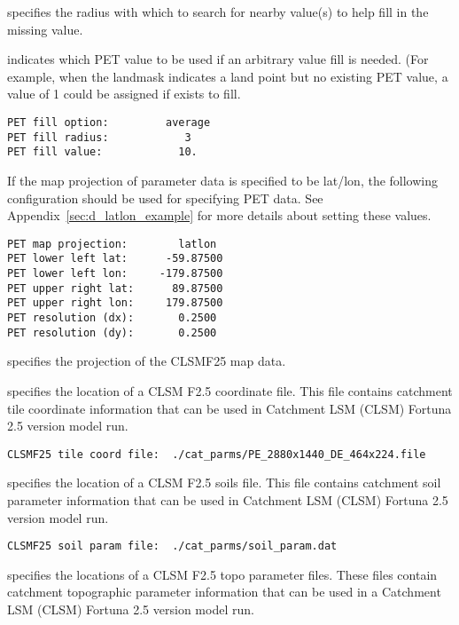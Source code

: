   specifies the radius with which
 to search for nearby value(s) to help fill in the missing value.

  indicates which  PET
 value to be used if an arbitrary value fill is needed. 
 (For example, when the landmask indicates a land point but no existing 
 PET value, a value of 1 could be assigned if exists to fill.
 \nextpar
 

 \begin{Verbatim}[frame=single]
PET fill option:         average
PET fill radius:            3
PET fill value:            10.
 \end{Verbatim}

 
 If the map projection of parameter data is specified to be lat/lon, 
 the following configuration should be used for specifying PET data.
 See Appendix~\ref{sec:d_latlon_example} for more details about
 setting these values.
 

 \begin{Verbatim}[frame=single]
PET map projection:        latlon
PET lower left lat:      -59.87500
PET lower left lon:     -179.87500
PET upper right lat:      89.87500
PET upper right lon:     179.87500
PET resolution (dx):       0.2500
PET resolution (dy):       0.2500
 \end{Verbatim}

 
  specifies the projection of the
 CLSMF25 map data.
 

 
  specifies the location of a CLSM F2.5
 coordinate file.  This file contains catchment tile coordinate
 information that can be used in
 Catchment LSM (CLSM) Fortuna 2.5 version model run.
 

 \begin{Verbatim}[frame=single]
CLSMF25 tile coord file:  ./cat_parms/PE_2880x1440_DE_464x224.file
 \end{Verbatim}

 
  specifies the location of a
 CLSM F2.5 soils file.  This file contains catchment soil parameter
 information that can be used in Catchment LSM (CLSM) Fortuna 2.5
 version model run.
 

 \begin{Verbatim}[frame=single]
CLSMF25 soil param file:  ./cat_parms/soil_param.dat
 \end{Verbatim}

 
  specifies the locations of a CLSM F2.5
 topo parameter files.  These files contain catchment topographic
 parameter information that can be used in a Catchment LSM (CLSM)
 Fortuna 2.5 version model run.

